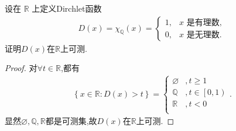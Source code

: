 \documentclass[../../main.tex]{subfiles}
\begin{document}
\begin{example}
设在 \(\mathbb{R}\) 上定义Dirchlet函数
\begin{align*}
D(x)=\chi_{\mathbb{Q}}(x)=\begin{cases}
1, & x\text{ 是有理数},\\
0, & x\text{ 是无理数}.
\end{cases}
\end{align*}
证明$D(x)$在$\mathbb{R}$上可测.
\end{example}
\begin{proof}
对$\forall t\in \mathbb{R}$,都有
\begin{align*}
\left\{ x\in \mathbb{R} :D\left( x \right) >t \right\} =\begin{cases}
\varnothing &,t\geqslant 1\\
\mathbb{Q} &,t\in \left[ 0,1 \right)\\
\mathbb{R} &,t<0\\
\end{cases}.
\end{align*}
显然$\varnothing,\mathbb{Q},\mathbb{R}$都是可测集,故$D\left( x \right)$在$\mathbb{R}$上可测.
\end{proof}
\end{document}
